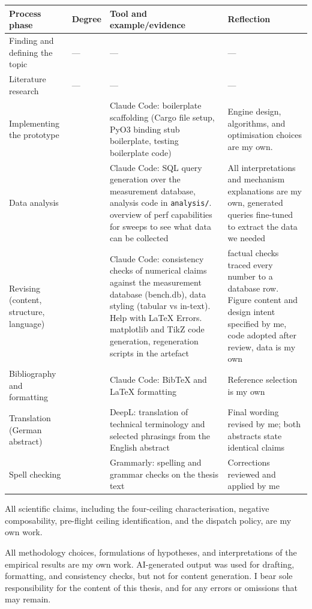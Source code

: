 \footnotesize
\begin{tabular}{|>{\raggedright\arraybackslash}p{2.9cm}|>{\centering\arraybackslash}p{1.1cm}|>{\raggedright\arraybackslash}p{4.6cm}|>{\raggedright\arraybackslash}p{4.2cm}|}
\hline
\textbf{Process phase} & \textbf{Degree} & \textbf{Tool and example/evidence} & \textbf{Reflection} \\
\hline
Finding and defining the topic & --- & --- & --- \\
\hline
Literature research & --- & --- & --- \\
\hline
Implementing the prototype & 3 & Claude Code: boilerplate scaffolding (Cargo file setup, PyO3 binding stub boilerplate, testing boilerplate code) & Engine design, algorithms, and optimisation choices are my own. \\
\hline
Data analysis & 3 & Claude Code: SQL query generation over the measurement database, analysis code in \texttt{analysis/}. overview of perf capabilities for sweeps to see what data can be collected & All interpretations and mechanism explanations are my own, generated queries fine-tuned to extract the data we needed \\
\hline
Revising (content, structure, language) & 2 & Claude Code: consistency checks of numerical claims against the measurement database (bench.db), data styling (tabular vs in-text). Help with \LaTeX{} Errors.  matplotlib and TikZ code generation, regeneration scripts in the artefact & factual checks traced every number to a database row.  Figure content and design intent specified by me, code adopted after review, data is my own \\
\hline
Bibliography and formatting & 3 & Claude Code: BibTeX and \LaTeX{} formatting & Reference selection is my own \\
\hline
Translation (German abstract) & 2 & DeepL: translation of technical terminology and selected phrasings from the English abstract & Final wording revised by me; both abstracts state identical claims \\
\hline
Spell checking & 1 & Grammarly: spelling and grammar checks on the thesis text & Corrections reviewed and applied by me \\
\hline
\end{tabular}

\normalsize
\vspace{0.5cm}

\noindent All scientific claims, including the four-ceiling characterisation, negative composability, pre-flight ceiling identification, and the dispatch policy, are my own work.

All methodology choices, formulations of hypotheses, and interpretations of the empirical results are my own work. AI-generated output was used for drafting, formatting, and consistency checks, but not for content generation. I bear sole responsibility for the content of this thesis, and for any errors or omissions that may remain.